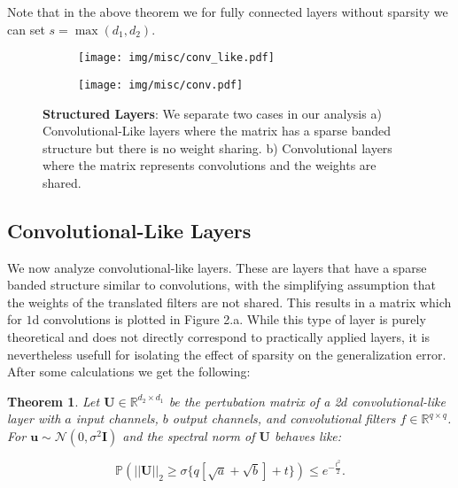\documentclass{article} %
\newtheorem{theorem}{Theorem}[section]
\theoremstyle{definition}
\begin{document}
Note that in the above theorem we for fully connected layers without sparsity we can set $s = \max(d_1,d_2)$.

\begin{figure*}[t!]
\centering
\begin{subfigure}{.5\textwidth}
  \centering
  \texttt{[image: img/misc/conv\_like.pdf]}
  \caption{}
\end{subfigure}%
\begin{subfigure}{.5\textwidth}
  \centering
  \texttt{[image: img/misc/conv.pdf]}
  \caption{}
\end{subfigure}
\caption{\textbf{Structured Layers}: We separate two cases in our analysis a) Convolutional-Like layers where the matrix has a sparse banded structure but there is no weight sharing. b) Convolutional layers where the matrix represents convolutions and the weights are shared.}
\end{figure*}

\subsection{Convolutional-Like Layers}
We now analyze convolutional-like layers. These are layers that have a sparse banded structure similar to convolutions, with the simplifying assumption that the weights of the translated filters are not shared. This results in a matrix which for $1$d convolutions is plotted in Figure 2.a. While this type of layer is purely theoretical and does not directly correspond to practically applied layers, it is nevertheless usefull for isolating the effect of sparsity on the generalization error. After some calculations we get the following:
\begin{theorem}
Let $\boldsymbol{U} \in \mathbb{R}^{d_2 \times d_1}$ be the pertubation matrix of a 2$d$ convolutional-like layer with $a$ input channels, $b$ output channels, and convolutional filters $f \in \mathbb{R}^{q \times q}$. For $\boldsymbol{u} \sim \mathcal{N}(0,\sigma^2 \boldsymbol{I})$ and  the spectral norm of $\boldsymbol{U}$ behaves like:



\begin{equation}
\mathbb{P}(||\boldsymbol{U}||_2 \geq \sigma \{ q [\sqrt{a} + \sqrt{b}] + t \}   ) \leq e^{-\frac{t^2}{2}}.
\end{equation}
\end{theorem}
\end{document}
